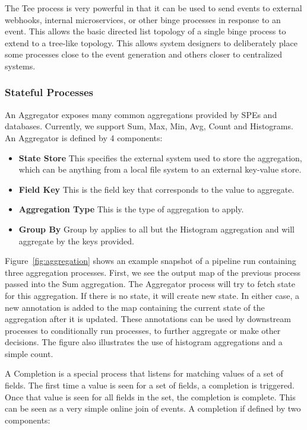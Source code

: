 \documentclass[10pt,twocolumn]{article}
\begin{document}
The Tee process is very powerful in that it can be used to send events to
external webhooks, internal microservices, or other binge processes in response
to an event.  This allows the basic directed list topology of a single binge
process to extend to a tree-like topology.  This allows system designers to
deliberately place some processes close to the event generation and others
closer to centralized systems.

\subsubsection{Stateful Processes}

An Aggregator exposes many common aggregations provided by SPEs and databases.
Currently, we support Sum, Max, Min, Avg, Count and Histograms.  An Aggregator
is defined by 4 components:

\begin{itemize}
\item[]{\bfseries State Store} This specifies the external system used to store
the aggregation, which can be anything from a local file system to an external
key-value store.
\item[]{\bfseries Field Key} This is the field key that corresponds to the value to aggregate.
\item[]{\bfseries Aggregation Type} This is the type of aggregation to apply.
\item[]{\bfseries Group By} Group by applies to all but the Histogram aggregation and will aggregate by the keys provided.
\end{itemize}

Figure~\ref{fig:aggregation} shows an example snapshot of a pipeline run
containing three aggregation processes.  First, we see the output map of the
previous process passed into the Sum aggregation.  The Aggregator process will
try to fetch state for this aggregation.  If there is no state, it will create
new state.  In either case, a new annotation is added to the map containing the
current state of the aggregation after it is updated.  These annotations can be
used by downstream processes to conditionally run processes, to further
aggregate or make other decisions.  The figure also illustrates the use of
histogram aggregations and a simple count.

A Completion is a special process that listens for matching values of a set of
fields.  The first time a value is seen for a set of fields, a completion is
triggered.  Once that value is seen for all fields in the set, the completion
is complete.  This can be seen as a very simple online join of events.  A completion
if defined by two components:
\end{document}
